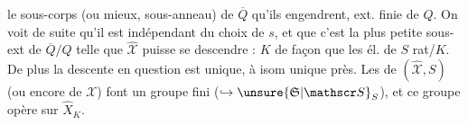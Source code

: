le sous-corps (ou mieux, sous-anneau) de $\overline{Q}$
qu'ils engendrent, ext. finie de $Q$. On voit de
suite qu'il est indépendant du choix de
$s$, et que c'est la plus petite sous-ext
de $\overline{Q}/Q$ telle que $\widehat{\mathscr X}$ puisse se descendre  : $K$
de façon que les él. de $S$  rat/$K$.
De plus la descente en question est unique,
à isom unique près. Les  de
$(\widehat{\mathscr X},S)$ (ou encore de $\mathscr X$) font un groupe
fini ($\hookrightarrow \unsure{\mathfrak S|\mathscr S}_S$), et ce groupe opère 
sur $\widehat X_K$.
